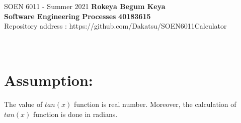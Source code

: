 \documentclass[a4paper, 11pt]{report}
\begin{document}
\newpage
\section*{}
\normalsize {SOEN 6011 - Summer 2021} \hfill \textbf{Rokeya Begum Keya} \\
\textbf{ Software Engineering Processes}  \hfill \textbf{40183615} \\
\hfill Repository address : https://github.com/Dakatsu/SOEN6011Calculator
\\\\\\
\section*{Assumption:} 
The value of $tan(x)$ function is real number. Moreover, the calculation of $tan(x)$ function is done in radians.
\\\
\end{document}
